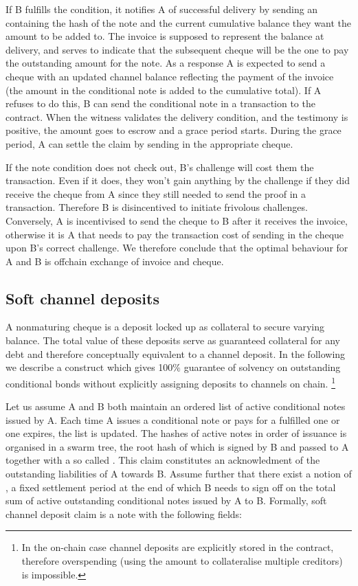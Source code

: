 If B fulfills the condition, it notifies A of successful delivery
by sending an  containing the hash of the note and the current cumulative balance they want the
amount to be added to. The invoice is supposed to represent the balance at delivery, and serves to
indicate that the subsequent cheque will be the one to pay the outstanding amount for the note.
As a response A is expected to send a cheque with an updated channel balance reflecting the
payment of the invoice (the amount in the conditional note is added to the cumulative total).
If A refuses to do this, B can send the conditional note in a transaction
to  the contract. When the witness validates the delivery condition, and the testimony is
positive, the amount goes to escrow and a grace period starts.
During the grace period, A can settle the claim by sending in the appropriate cheque.

If the note condition does not check out, B's challenge will cost them the transaction.
Even if it does, they won't gain anything by the challenge if they did receive the
cheque from A since they still needed to send the proof in a transaction.
Therefore B is disincentived to initiate frivolous challenges.
Conversely, A is incentivised to send the cheque to B after it receives the invoice,
otherwise it is A that needs to pay the transaction cost of sending in the cheque upon B's correct challenge.
We therefore conclude that the optimal behaviour for A and B is offchain exchange of invoice and cheque.

\subsection{Soft channel deposits}
A nonmaturing cheque is a deposit locked up as collateral to secure varying balance.
The total value of these deposits serve as guaranteed collateral for any debt and
therefore conceptually equivalent to a channel deposit.
In the following we describe a construct which gives 100$\%$ guarantee of solvency
on outstanding conditional bonds without explicitly assigning deposits to channels on chain.%
%
\footnote{In the on-chain case channel deposits are explicitly stored in the contract, therefore overspending
(using the amount to collateralise multiple creditors) is impossible.}

Let us assume A and B both maintain an ordered list of active conditional notes issued by A.
Each time A issues a conditional note or pays for a fulfilled one or one expires, the list is updated.
The hashes of active notes in order of issuance is organised in a swarm tree, the
root hash of which is signed by B and passed to A together with a so called
. This claim constitutes an acknowledment of
the outstanding liabilities of A towards B. Assume further that there exist a notion of ,
a fixed settlement period at the end of which B needs to sign off on the total sum of active
outstanding conditional notes issued by A to B.
Formally, soft channel deposit claim is a note with the following fields:

